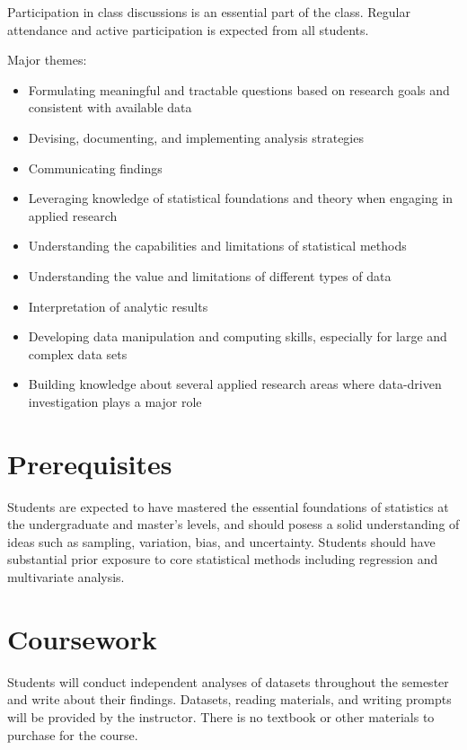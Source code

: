 \documentclass[11pt]{article}
\begin{document}
Participation in class discussions is an essential part of the class.
Regular attendance and active participation is expected from all students.

Major themes:
\begin{itemize}
	\item Formulating meaningful and tractable questions based on research goals and consistent with available data
	\item Devising, documenting, and implementing analysis strategies
	\item Communicating findings
	\item Leveraging knowledge of statistical foundations and theory when engaging in applied research
	\item Understanding the capabilities and limitations of statistical methods
	\item Understanding the value and limitations of different types of data
	\item Interpretation of analytic results
	\item Developing data manipulation and computing skills, especially for large and complex data sets
	\item Building knowledge about several applied research areas where data-driven investigation plays a major role
\end{itemize}

\section*{Prerequisites}

Students are expected to have mastered the essential foundations of statistics at the undergraduate and master’s levels, and should posess a solid understanding of ideas such as sampling, variation, bias, and uncertainty. Students should have substantial prior exposure to core statistical methods including regression and multivariate analysis.

\section*{Coursework}

Students will conduct independent analyses of datasets throughout the semester and write about their findings. Datasets, reading materials, and writing prompts will be provided by the instructor.
There is no textbook or other materials to purchase for the course.
\end{document}
